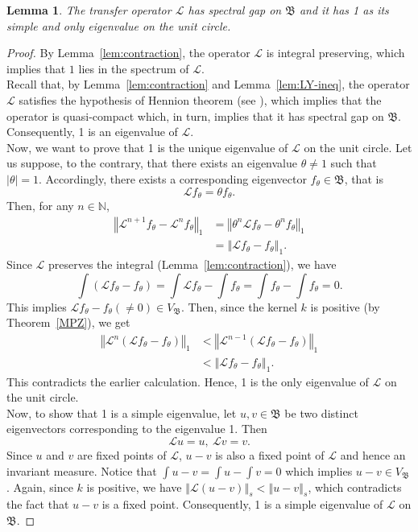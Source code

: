 \documentclass{amsart}
\newtheorem{lemma}[theorem]{Lemma}
\newcommand\cL{{\mathcal L}}
\newcommand\bN{{\mathbb N}}
\newcommand\fB{{\mathfrak B}}
\newcommand{\norm}[1]{\left\Vert#1\right\Vert}
\begin{document}
\begin{lemma}\label{lem:simple_ev}
The transfer operator \(\cL\) has spectral gap on $\fB$ and it has 1 as its simple and only eigenvalue on the unit circle.
\end{lemma}
\begin{proof}

    By Lemma~\ref{lem:contraction}, the operator \(\cL\) is integral preserving, which implies that \(1\) lies in the spectrum of \(\cL\).\\
   Recall that, by Lemma~\ref{lem:contraction} and Lemma~\ref{lem:LY-ineq}, the operator \(\cL\) satisfies the hypothesis of Hennion theorem (see \cite[Theorem~B.14]{DKL21}), which implies that the operator is quasi-compact which, in turn, implies that it has spectral gap on \(\fB\). Consequently, 1 is an eigenvalue of \(\cL\). \\
   Now, we want to prove that 1 is the unique eigenvalue of \(\cL\) on the unit circle. Let us suppose, to the contrary, that there exists an eigenvalue \(\theta\neq 1\) such that \(|\theta|=1\). Accordingly, there exists a corresponding eigenvector \(f_\theta\in\fB\), that is 
\[
\cL f_\theta=\theta f_\theta.
\] 
Then, for any \(n\in\bN\), 
\[
\begin{split}
    \norm{\cL^{n+1}f_\theta-\cL^n f_\theta}_{1}&=\norm{\theta^n\cL f_\theta-\theta^n f_\theta}_{1}\\
    & = \norm{\cL f_\theta-f_\theta}_{1}.
\end{split}
\]
Since \(\cL\) preserves the integral (Lemma~\ref{lem:contraction}), we have 
\[
\int (\cL f_\theta-f_\theta) = \int \cL f_\theta-\int f_\theta=\int f_\theta-\int f_\theta =0.
\]
 This implies \(\cL f_\theta-f_\theta(\neq 0)\in V_\fB\). Then, since the kernel \(k\) is positive (by Theorem~\ref{MPZ}), we get
\[
\begin{split}
    \norm{\cL^n(\cL f_\theta-f_\theta)}_{1}&<\norm{\cL^{n-1}(\cL f_\theta-f_\theta)}_{1}\\
&<\norm{\cL f_\theta-f_\theta}_{1}.
\end{split}
\]
This contradicts the earlier calculation. Hence, 1 is the only eigenvalue of \(\cL\) on the unit circle. \\
Now, to show that 1 is a simple eigenvalue, let \(u,v\in\fB\) be two distinct eigenvectors corresponding to the eigenvalue 1. Then 
\[\cL u=u,\  \cL v=v .\]
Since \(u\) and \( v\) are fixed points of \(\cL\), \(u-v\) is also a fixed point of \(\cL\) and hence an invariant measure. Notice that \(\int u-v=\int u-\int v=0\) which implies \(u-v\in V_\fB\). Again, since \(k\) is positive, we have \(\norm{\cL(u-v)}_s<\norm{u-v}_s\), which contradicts the fact that \(u-v\) is a fixed point. Consequently, 1 is a simple eigenvalue of \(\cL\) on \(\fB\).
\end{proof}
\end{document}
